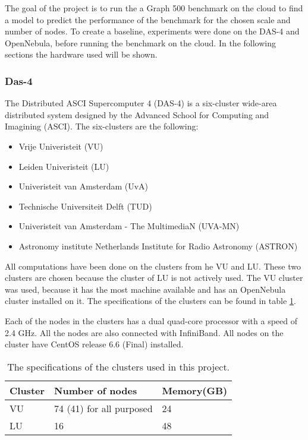 
The goal of the project is to run the a Graph 500 benchmark on the cloud to find a model to predict the performance of the benchmark for the chosen scale and number of nodes. To create a baseline, experiments were done on the DAS-4 and OpenNebula, before running the benchmark on the cloud. In the following sections the hardware used will be shown.
\subsubsection{Das-4}
\label{hw:das4}
The Distributed ASCI Supercomputer 4 (DAS-4) is a six-cluster wide-area distributed system designed by the Advanced School for Computing and Imagining (ASCI)\cite{das-4}. The six-clusters are the following:
\begin{itemize}
\item Vrije Univeristeit (VU)
\item Leiden Univeristeit (LU)
\item Univeristeit van Amsterdam (UvA) 
\item Technische Universiteit Delft (TUD)
\item Univeristeit van Amsterdam - The MultimediaN (UVA-MN) 
\item Astronomy institute Netherlands Institute for Radio Astronomy (ASTRON)
\end{itemize}
All computations have been done on the clusters from he VU and LU. These two clusters are chosen because the cluster of LU is not actively used. The VU cluster was used, because it has the most machine available and has an OpenNebula cluster installed on it. The specifications of the clusters can be found in table \ref{tab:das-clusters}. 

Each of the nodes in the clusters has a dual quad-core processor with a speed of 2.4 GHz. All the nodes are also connected with InfiniBand\cite{infiniband}. All nodes on the cluster have CentOS release 6.6 (Final) installed.
\begin{table}[!h]
	\begin{center}
\begin{tabular}{|l|l|l|}
\hline
Cluster & Number of nodes  & Memory(GB) \\ \hline
VU 		& 74 (41) for all purposed	 & 24			\\ \hline
LU		& 16 & 48 \\ \hline
\end{tabular}
\end{center}
\caption{The specifications of the clusters used in this project.}
\label{tab:das-clusters}
\end{table}



